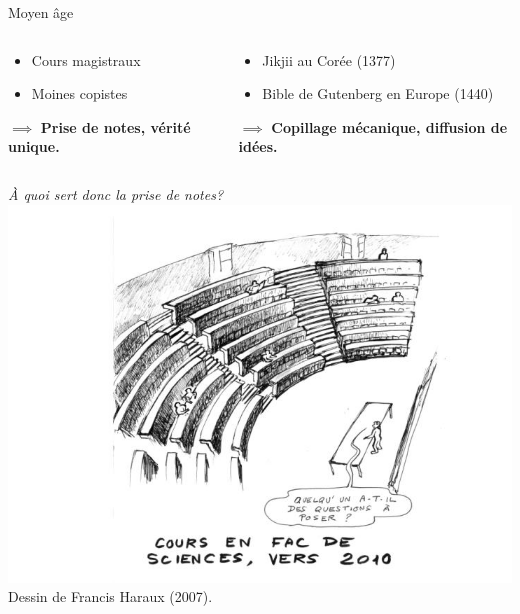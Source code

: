 \begin{frame}{Moyen âge}
\begin{columns}
	\begin{column}{0.49\linewidth}
		\begin{itemize}
			\item Cours magistraux
			\item Moines copistes
		\end{itemize}
		$\implies$ \textbf{Prise de notes, vérité unique.}
	\end{column}
	\begin{column}{0.49\linewidth}
		\begin{itemize}
			\item Jikjii au Corée (1377)
			\item Bible de Gutenberg en Europe (1440)
		\end{itemize}
		$\implies$ \textbf{Copillage mécanique, diffusion de idées.}
	\end{column}
\end{columns}
\end{frame}
\begin{frame}
\centering
\huge \emph{À quoi sert donc la prise de notes?}
\vfill
\centering
\includegraphics[height=0.5\paperheight]{../resources/illustrations/cours_magistral} \\
\vfill \hfill
\large Dessin de Francis Haraux (2007).\hfill \hfill
\end{frame}

